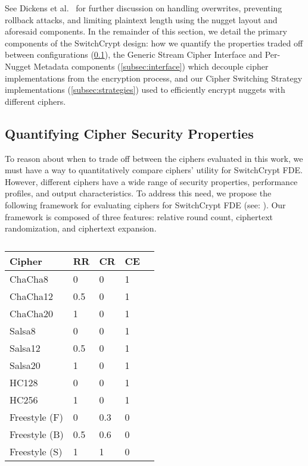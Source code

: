 See Dickens et al.~\cite{StrongBox} for further discussion on handling
overwrites, preventing rollback attacks, and limiting plaintext length using the
nugget layout and aforesaid components. In the remainder of this section, we
detail the primary components of the SwitchCrypt design: how we quantify the
properties traded off between configurations (\cref{subsec:quantify}), the
Generic Stream Cipher Interface and Per-Nugget Metadata components
(\cref{subsec:interface}) which decouple cipher implementations from the
encryption process, and our Cipher Switching Strategy implementations
(\cref{subsec:strategies}) used to efficiently encrypt nuggets with different
ciphers.

\subsection{Quantifying Cipher Security Properties} \label{subsec:quantify}

To reason about when to trade off between the ciphers evaluated in this work, we
must have a way to quantitatively compare ciphers' utility for SwitchCrypt FDE.
However, different ciphers have a wide range of security properties, performance
profiles, and output characteristics. To address this need, we propose the
following framework for evaluating ciphers for SwitchCrypt FDE (see:
). Our framework is composed of three features: relative
round count, ciphertext randomization, and ciphertext expansion.

\begin{table}[]
   \begin{tabular}{@{}lllll@{}}
   \toprule
   \textbf{Cipher} & \textbf{RR} & \textbf{CR} & \textbf{CE} \\ \midrule
   ChaCha8         & 0           & 0           & 1           \\
   ChaCha12        & 0.5         & 0           & 1           \\
   ChaCha20        & 1           & 0           & 1           \\
   Salsa8          & 0           & 0           & 1           \\
   Salsa12         & 0.5         & 0           & 1           \\
   Salsa20         & 1           & 0           & 1           \\
   HC128           & 0           & 0           & 1           \\
   HC256           & 1           & 0           & 1           \\
   Freestyle (F)   & 0           & 0.3         & 0           \\
   Freestyle (B)   & 0.5         & 0.6         & 0           \\
   Freestyle (S)   & 1           & 1           & 0           \\
\end{tabular}
   \caption{}
   \label{tbl:security-quant}
 \end{table}

